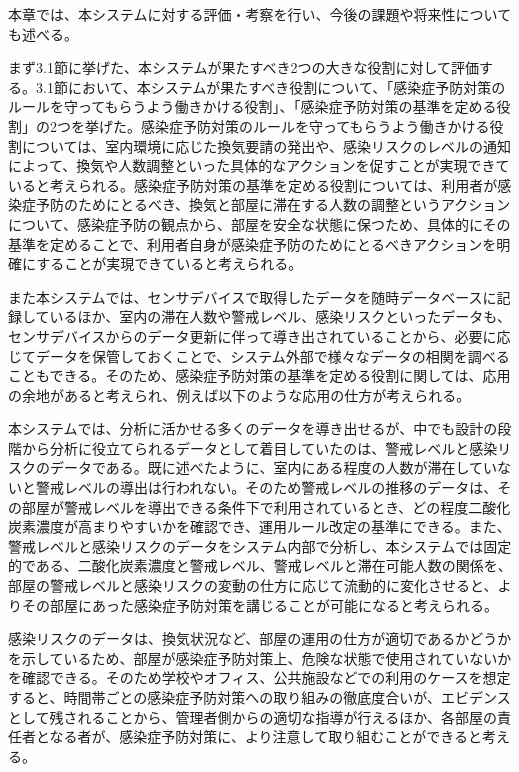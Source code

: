 本章では、本システムに対する評価・考察を行い、今後の課題や将来性についても述べる。

まず3.1節に挙げた、本システムが果たすべき2つの大きな役割に対して評価する。3.1節において、本システムが果たすべき役割について、「感染症予防対策のルールを守ってもらうよう働きかける役割」、「感染症予防対策の基準を定める役割」の2つを挙げた。感染症予防対策のルールを守ってもらうよう働きかける役割については、室内環境に応じた換気要請の発出や、感染リスクのレベルの通知によって、換気や人数調整といった具体的なアクションを促すことが実現できていると考えられる。感染症予防対策の基準を定める役割については、利用者が感染症予防のためにとるべき、換気と部屋に滞在する人数の調整というアクションについて、感染症予防の観点から、部屋を安全な状態に保つため、具体的にその基準を定めることで、利用者自身が感染症予防のためにとるべきアクションを明確にすることが実現できていると考えられる。

また本システムでは、センサデバイスで取得したデータを随時データベースに記録しているほか、室内の滞在人数や警戒レベル、感染リスクといったデータも、センサデバイスからのデータ更新に伴って導き出されていることから、必要に応じてデータを保管しておくことで、システム外部で様々なデータの相関を調べることもできる。そのため、感染症予防対策の基準を定める役割に関しては、応用の余地があると考えられ、例えば以下のような応用の仕方が考えられる。

本システムでは、分析に活かせる多くのデータを導き出せるが、中でも設計の段階から分析に役立てられるデータとして着目していたのは、警戒レベルと感染リスクのデータである。既に述べたように、室内にある程度の人数が滞在していないと警戒レベルの導出は行われない。そのため警戒レベルの推移のデータは、その部屋が警戒レベルを導出できる条件下で利用されているとき、どの程度二酸化炭素濃度が高まりやすいかを確認でき、運用ルール改定の基準にできる。また、警戒レベルと感染リスクのデータをシステム内部で分析し、本システムでは固定的である、二酸化炭素濃度と警戒レベル、警戒レベルと滞在可能人数の関係を、部屋の警戒レベルと感染リスクの変動の仕方に応じて流動的に変化させると、よりその部屋にあった感染症予防対策を講じることが可能になると考えられる。

感染リスクのデータは、換気状況など、部屋の運用の仕方が適切であるかどうかを示しているため、部屋が感染症予防対策上、危険な状態で使用されていないかを確認できる。そのため学校やオフィス、公共施設などでの利用のケースを想定すると、時間帯ごとの感染症予防対策への取り組みの徹底度合いが、エビデンスとして残されることから、管理者側からの適切な指導が行えるほか、各部屋の責任者となる者が、感染症予防対策に、より注意して取り組むことができると考える。

